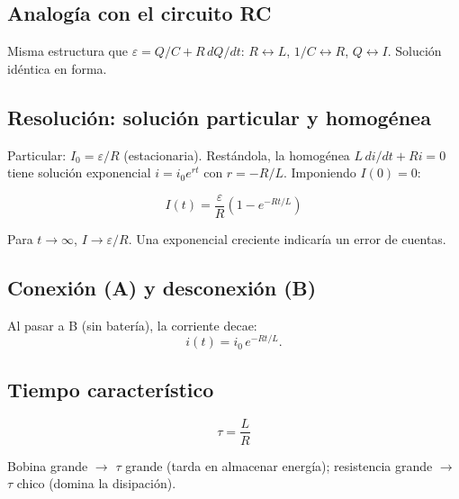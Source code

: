 \documentclass[12pt,a4paper]{article}
\begin{document}


\subsection{Analogía con el circuito RC}

Misma estructura que $\varepsilon = Q/C + R\,dQ/dt$: $R \leftrightarrow L$,
$1/C \leftrightarrow R$, $Q \leftrightarrow I$. Solución idéntica en forma.



\subsection{Resolución: solución particular y homogénea}

Particular: $I_0 = \varepsilon/R$ (estacionaria). Restándola, la homogénea
$L\,di/dt + R i = 0$ tiene solución exponencial $i = i_0 e^{rt}$ con
$r = -R/L$. Imponiendo $I(0)=0$:

\begin{keybox}
  \[
  \boxed{I(t) = \frac{\varepsilon}{R}\left(1 - e^{-Rt/L}\right)}
  \]
\end{keybox}

\begin{warnbox}
  Para $t\to\infty$, $I\to\varepsilon/R$. Una exponencial creciente indicaría un
  error de cuentas.
\end{warnbox}

\subsection{Conexión (A) y desconexión (B)}

Al pasar a B (sin batería), la corriente decae:
\[
i(t) = i_0\, e^{-Rt/L}.
\]

\subsection{Tiempo característico}

\begin{keybox}
  \[
  \boxed{\tau = \frac{L}{R}}
  \]
\end{keybox}

Bobina grande $\to$ $\tau$ grande (tarda en almacenar energía); resistencia
grande $\to$ $\tau$ chico (domina la disipación).


\end{document}
